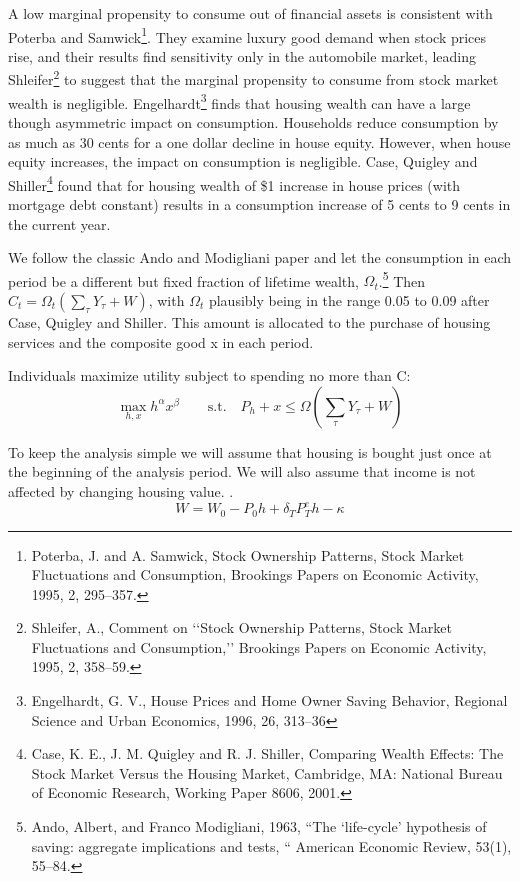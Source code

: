 \documentclass[11pt]{amsart}
\begin{document}
A low marginal propensity to consume out of financial assets is consistent with Poterba and Samwick\footnote{Poterba, J. and A. Samwick, Stock Ownership Patterns, Stock Market Fluctuations and Consumption, Brookings Papers on Economic Activity, 1995, 2, 295–357.}. They examine luxury good demand when stock prices rise, and their results find sensitivity only in the automobile market, leading Shleifer\footnote{Shleifer, A., Comment on ‘‘Stock Ownership Patterns, Stock Market Fluctuations and Consumption,’’ Brookings Papers on Economic Activity, 1995, 2, 358–59.} to suggest that the marginal propensity to consume from stock market wealth is negligible. Engelhardt\footnote{Engelhardt, G. V., House Prices and Home Owner Saving Behavior, Regional Science and Urban Economics, 1996, 26, 313–36} finds that housing wealth can have a large though asymmetric impact on consumption. Households reduce consumption by as much as 30 cents for a one dollar decline in house equity. However, when house equity increases, the impact on consumption is negligible. Case, Quigley and Shiller\footnote{Case, K. E., J. M. Quigley and R. J. Shiller, Comparing Wealth Effects: The Stock Market Versus the Housing Market, Cambridge, MA: National Bureau of Economic Research, Working Paper 8606, 2001.} found that for housing wealth of \$1 increase in house prices (with mortgage debt constant) results in a consumption increase of 5 cents to 9 cents in the current year.

We follow the classic  Ando and Modigliani paper and let the consumption in each period be a different but fixed fraction of lifetime wealth, $\Omega_t$.\footnote{Ando, Albert, and Franco Modigliani, 1963, “The ‘life-cycle’ hypothesis of saving: aggregate implications and tests, “ American Economic Review, 53(1), 55–84. }  Then $C_t=\Omega_t(\sum_{\tau}Y_{\tau}+W)$, with $\Omega_t$ plausibly being in the range 0.05 to 0.09 after Case, Quigley and Shiller. This amount is allocated to the purchase of housing services and the composite good x in each period. 

Individuals maximize utility  subject to spending  no more than C:
\[\displaystyle\max_{h,x}h^{\alpha}x^{\beta}\quad\quad \textrm{s.t.} \quad P_h+x \leq \Omega(\sum_{\tau}Y_{\tau}+W)\]

To keep the analysis simple we will assume that  housing is bought just once at the beginning of the analysis period. We will also assume that income is not affected by changing housing value.  .  
\[W= W_0 -P_0h+\delta_TP^e_Th-\kappa \]
\end{document}
